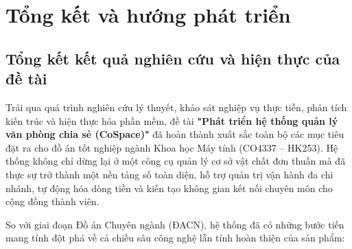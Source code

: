 \section{Tổng kết và hướng phát triển}

\subsection{Tổng kết kết quả nghiên cứu và hiện thực của đề tài}

Trải qua quá trình nghiên cứu lý thuyết, khảo sát nghiệp vụ thực tiễn, phân tích kiến trúc và hiện thực hóa phần mềm, đề tài \textbf{"Phát triển hệ thống quản lý văn phòng chia sẻ (CoSpace)"} đã hoàn thành xuất sắc toàn bộ các mục tiêu đặt ra cho đồ án tốt nghiệp ngành Khoa học Máy tính (CO4337 -- HK253). Hệ thống không chỉ dừng lại ở một công cụ quản lý cơ sở vật chất đơn thuần mà đã thực sự trở thành một nền tảng số toàn diện, hỗ trợ quản trị vận hành đa chi nhánh, tự động hóa dòng tiền và kiến tạo không gian kết nối chuyên môn cho cộng đồng thành viên.

So với giai đoạn Đồ án Chuyên ngành (ĐACN), hệ thống đã có những bước tiến mang tính đột phá về cả chiều sâu công nghệ lẫn tính hoàn thiện của sản phẩm:


